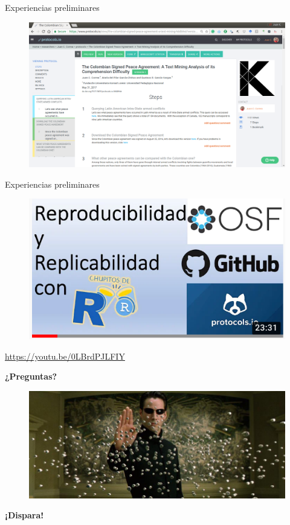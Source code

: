 \documentclass{beamer}
\begin{document}
\begin{frame}{Experiencias preliminares}
\Large
\begin{figure}
\centering
 \includegraphics[width=.9\textwidth]{protocols}
\end{figure}
\end{frame}

\begin{frame}{Experiencias preliminares}
\begin{figure}
\centering
\includegraphics[width=.8\textwidth]{chupitos.png}
\end{figure}
\textcolor{blue}{\url{https://youtu.be/0LBrdPJLFIY}}
\end{frame}






\begin{frame}
\centering
\textbf{¿Preguntas?}
\begin{figure}
\centering
 \includegraphics[width=1\textwidth]{Neo}
\end{figure}
\textbf{¡Dispara!}
\end{frame}
\end{document}
